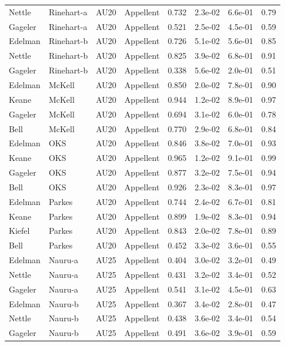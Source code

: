 \documentclass{monashthesis}
\begin{document}
\begin{center}
\begin{longtable}{llllllll}
Nettle & Rinehart-a & AU20 & Appellent & 0.732 & 2.3e-02 & 6.6e-01 & 0.79 \\
Gageler & Rinehart-a & AU20 & Appellent & 0.521 & 2.5e-02 & 4.5e-01 & 0.59 \\
Edelman & Rinehart-b & AU20 & Appellent & 0.726 & 5.1e-02 & 5.6e-01 & 0.85 \\
Nettle & Rinehart-b & AU20 & Appellent & 0.825 & 3.9e-02 & 6.8e-01 & 0.91 \\
Gageler & Rinehart-b & AU20 & Appellent & 0.338 & 5.6e-02 & 2.0e-01 & 0.51 \\
Edelman & McKell & AU20 & Appellent & 0.850 & 2.0e-02 & 7.8e-01 & 0.90 \\
Keane & McKell & AU20 & Appellent & 0.944 & 1.2e-02 & 8.9e-01 & 0.97 \\
Gageler & McKell & AU20 & Appellent & 0.694 & 3.1e-02 & 6.0e-01 & 0.78 \\
Bell & McKell & AU20 & Appellent & 0.770 & 2.9e-02 & 6.8e-01 & 0.84 \\
Edelman & OKS & AU20 & Appellent & 0.846 & 3.8e-02 & 7.0e-01 & 0.93 \\
Keane & OKS & AU20 & Appellent & 0.965 & 1.2e-02 & 9.1e-01 & 0.99 \\
Gageler & OKS & AU20 & Appellent & 0.877 & 3.2e-02 & 7.5e-01 & 0.94 \\
Bell & OKS & AU20 & Appellent & 0.926 & 2.3e-02 & 8.3e-01 & 0.97 \\
Edelman & Parkes & AU20 & Appellent & 0.744 & 2.4e-02 & 6.7e-01 & 0.81 \\
Keane & Parkes & AU20 & Appellent & 0.899 & 1.9e-02 & 8.3e-01 & 0.94 \\
Kiefel & Parkes & AU20 & Appellent & 0.843 & 2.0e-02 & 7.8e-01 & 0.89 \\
Bell & Parkes & AU20 & Appellent & 0.452 & 3.3e-02 & 3.6e-01 & 0.55 \\
Edelman & Nauru-a & AU25 & Appellent & 0.404 & 3.0e-02 & 3.2e-01 & 0.49 \\
Nettle & Nauru-a & AU25 & Appellent & 0.431 & 3.2e-02 & 3.4e-01 & 0.52 \\
Gageler & Nauru-a & AU25 & Appellent & 0.541 & 3.1e-02 & 4.5e-01 & 0.63 \\
Edelman & Nauru-b & AU25 & Appellent & 0.367 & 3.4e-02 & 2.8e-01 & 0.47 \\
Nettle & Nauru-b & AU25 & Appellent & 0.438 & 3.6e-02 & 3.4e-01 & 0.54 \\
Gageler & Nauru-b & AU25 & Appellent & 0.491 & 3.6e-02 & 3.9e-01 & 0.59 \\

\end{longtable}
\end{center}
\end{document}
